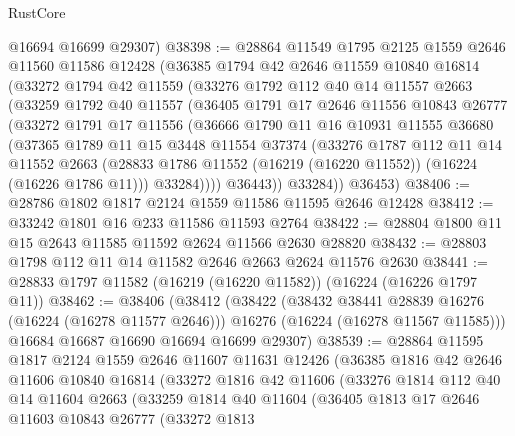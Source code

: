 \begin{lexlean}{RustCore}
\begin{coremodule}
      @16694
      @16699
      @29307)
@38398 := @28864
    @11549
    @1795
    @2125
    @1559
    @2646
    @11560
    @11586
    @12428
    (@36385
      @1794
      @42
      @2646
      @11559
      @10840
      @16814
      (@33272
        @1794
        @42
        @11559
        (@33276
          @1792
          @112
          @40
          @14
          @11557
          @2663
          (@33259
            @1792
            @40
            @11557
            (@36405
              @1791
              @17
              @2646
              @11556
              @10843
              @26777
              (@33272
                @1791
                @17
                @11556
                (@36666
                  @1790
                  @11
                  @16
                  @10931
                  @11555
                  @36680
                  (@37365
                    @1789
                    @11
                    @15
                    @3448
                    @11554
                    @37374
                    (@33276
                      @1787
                      @112
                      @11
                      @14
                      @11552
                      @2663
                      (@28833 @1786 @11552 (@16219 (@16220 @11552)) (@16224 (@16226 @1786 @11)))
                      @33284))))
              @36443))
          @33284))
      @36453)
@38406 := @28786 @1802 @1817 @2124 @1559 @11586 @11595 @2646 @12428
@38412 := @33242 @1801 @16 @233 @11586 @11593 @2764
@38422 := @28804 @1800 @11 @15 @2643 @11585 @11592 @2624 @11566 @2630 @28820
@38432 := @28803 @1798 @112 @11 @14 @11582 @2646 @2663 @2624 @11576 @2630
@38441 := @28833 @1797 @11582 (@16219 (@16220 @11582)) (@16224 (@16226 @1797 @11))
@38462 := @38406
    (@38412
      (@38422
        (@38432 @38441 @28839 @16276 (@16224 (@16278 @11577 @2646)))
        @16276
        (@16224 (@16278 @11567 @11585)))
      @16684
      @16687
      @16690
      @16694
      @16699
      @29307)
@38539 := @28864
    @11595
    @1817
    @2124
    @1559
    @2646
    @11607
    @11631
    @12426
    (@36385
      @1816
      @42
      @2646
      @11606
      @10840
      @16814
      (@33272
        @1816
        @42
        @11606
        (@33276
          @1814
          @112
          @40
          @14
          @11604
          @2663
          (@33259
            @1814
            @40
            @11604
            (@36405
              @1813
              @17
              @2646
              @11603
              @10843
              @26777
              (@33272
                @1813

\end{coremodule}
\end{lexlean}
